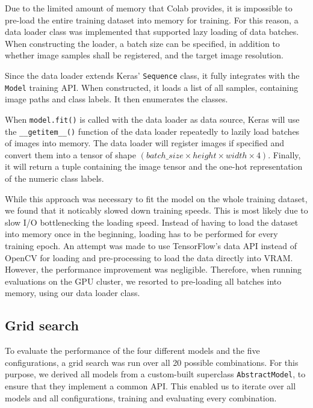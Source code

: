 \documentclass{l4proj}
\begin{document}
Due to the limited amount of memory that Colab provides, it is impossible to pre-load the entire training dataset into memory for training. For this reason, a data loader class was implemented that supported lazy loading of data batches. When constructing the loader, a batch size can be specified, in addition to whether image samples shall be registered, and the target image resolution. 

Since the data loader extends Keras' \lstinline{Sequence} class, it fully integrates with the \lstinline{Model} training API. When constructed, it loads a list of all samples, containing image paths and class labels. It then enumerates the classes.

When \lstinline{model.fit()} is called with the data loader as data source, Keras will use the \lstinline{__getitem__()} function of the data loader repeatedly to lazily load batches of images into memory. The data loader will register images if specified and convert them into a tensor of shape $(batch\_size \times height \times width \times 4)$. Finally, it will return a tuple containing the image tensor and the one-hot representation of the numeric class labels.

While this approach was necessary to fit the model on the whole training dataset, we found that it noticably slowed down training speeds. This is most likely due to slow I/O bottlenecking the loading speed. Instead of having to load the dataset into memory once in the beginning, loading has to be performed for every training epoch. An attempt was made to use TensorFlow's data API instead of OpenCV for loading and pre-processing to load the data directly into VRAM. However, the performance improvement was negligible. Therefore, when running evaluations on the GPU cluster, we resorted to pre-loading all batches into memory, using our data loader class.

\subsection{Grid search}
\label{gridsearch_impl}

To evaluate the performance of the four different models and the five configurations, a grid search was run over all 20 possible combinations. For this purpose, we derived all models from a custom-built superclass \lstinline{AbstractModel}, to ensure that they implement a common API. This enabled us to iterate over all models and all configurations, training and evaluating every combination.
\end{document}
